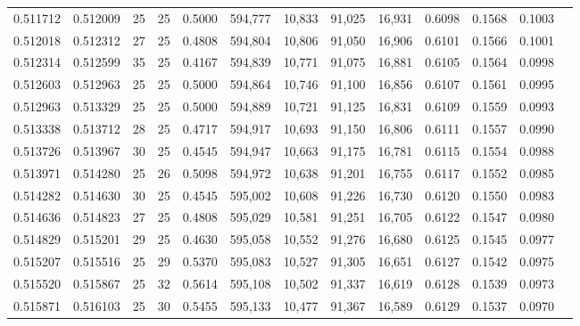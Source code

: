 \begin{tabular}{rrrrrrrrrrrrr}
0.511712 & 0.512009 &    25 &  25 &                                     0.5000 & 594,777 &  10,833 &  91,025 &  16,931 & 0.6098 & 0.1568 & 0.1003 \\
0.512018 & 0.512312 &    27 &  25 &                                     0.4808 & 594,804 &  10,806 &  91,050 &  16,906 & 0.6101 & 0.1566 & 0.1001 \\
0.512314 & 0.512599 &    35 &  25 &                                     0.4167 & 594,839 &  10,771 &  91,075 &  16,881 & 0.6105 & 0.1564 & 0.0998 \\
0.512603 & 0.512963 &    25 &  25 &                                     0.5000 & 594,864 &  10,746 &  91,100 &  16,856 & 0.6107 & 0.1561 & 0.0995 \\
0.512963 & 0.513329 &    25 &  25 &                                     0.5000 & 594,889 &  10,721 &  91,125 &  16,831 & 0.6109 & 0.1559 & 0.0993 \\
0.513338 & 0.513712 &    28 &  25 &                                     0.4717 & 594,917 &  10,693 &  91,150 &  16,806 & 0.6111 & 0.1557 & 0.0990 \\
0.513726 & 0.513967 &    30 &  25 &                                     0.4545 & 594,947 &  10,663 &  91,175 &  16,781 & 0.6115 & 0.1554 & 0.0988 \\
0.513971 & 0.514280 &    25 &  26 &                                     0.5098 & 594,972 &  10,638 &  91,201 &  16,755 & 0.6117 & 0.1552 & 0.0985 \\
0.514282 & 0.514630 &    30 &  25 &                                     0.4545 & 595,002 &  10,608 &  91,226 &  16,730 & 0.6120 & 0.1550 & 0.0983 \\
0.514636 & 0.514823 &    27 &  25 &                                     0.4808 & 595,029 &  10,581 &  91,251 &  16,705 & 0.6122 & 0.1547 & 0.0980 \\
0.514829 & 0.515201 &    29 &  25 &                                     0.4630 & 595,058 &  10,552 &  91,276 &  16,680 & 0.6125 & 0.1545 & 0.0977 \\
0.515207 & 0.515516 &    25 &  29 &                                     0.5370 & 595,083 &  10,527 &  91,305 &  16,651 & 0.6127 & 0.1542 & 0.0975 \\
0.515520 & 0.515867 &    25 &  32 &                                     0.5614 & 595,108 &  10,502 &  91,337 &  16,619 & 0.6128 & 0.1539 & 0.0973 \\
0.515871 & 0.516103 &    25 &  30 &                                     0.5455 & 595,133 &  10,477 &  91,367 &  16,589 & 0.6129 & 0.1537 & 0.0970 \\

\end{tabular}
